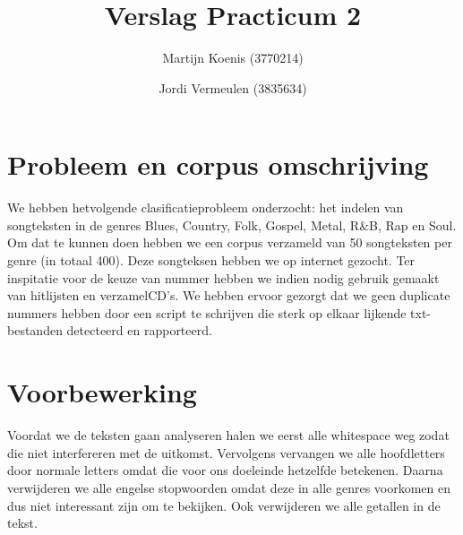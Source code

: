 \documentclass[a4paper,oneside]{article}
\begin{document}
\title{Verslag Practicum 2}
\author{Martijn Koenis (3770214) \and Jordi Vermeulen (3835634)}
\date{}
\maketitle


\begin{abstract}
\end{abstract}


\section{Probleem en corpus omschrijving}
We hebben hetvolgende clasificatieprobleem onderzocht: het indelen van songteksten in de genres Blues, Country, Folk, Gospel, Metal, R\&B, Rap en Soul.  Om dat te kunnen doen hebben we een corpus verzameld van 50 songteksten per genre (in totaal 400). Deze songteksen hebben we op internet gezocht. Ter inspitatie voor de keuze van nummer hebben we indien nodig gebruik gemaakt van hitlijsten en verzamelCD's. We hebben ervoor gezorgt dat we geen duplicate nummers hebben door een script te schrijven die sterk op elkaar lijkende txt-bestanden detecteerd en rapporteerd.

\section{Voorbewerking}
Voordat we de teksten gaan analyseren halen we eerst alle whitespace weg zodat die niet interfereren met de uitkomst. Vervolgens vervangen we alle hoofdletters door normale letters omdat die voor ons doeleinde hetzelfde betekenen. Daarna verwijderen we alle engelse stopwoorden omdat deze in alle genres voorkomen en dus niet interessant zijn om te bekijken. Ook verwijderen we alle getallen in de tekst.
\end{document}
